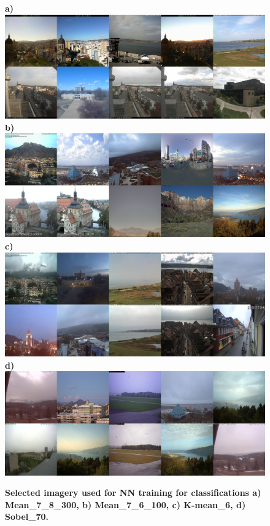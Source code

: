\documentclass[final,3p,times,authoryear]{elsarticle}
\begin{document}
\begin{figure}
\centering
\textbf{a)}\includegraphics[trim = 0mm 0mm 0mm 0mm,clip,scale=0.14]{Images/13-0_Mean_7_8_300_tiles.png}
\textbf{b)}\includegraphics[trim = 0mm 0mm 0mm 0mm,clip,scale=0.14]{Images/13-3_Mean_7_6_100_tiles.png}
\textbf{c)}\includegraphics[trim = 0mm 0mm 0mm 0mm,clip,scale=0.14]{Images/13-5_K-mean_6_tiles.png}
\textbf{d)}\includegraphics[trim = 0mm 0mm 0mm 0mm,clip,scale=0.14]{Images/13-9_Sobel_70_tiles.png}
\caption{\textbf{Selected imagery used for NN training for classifications 
a) Mean\_7\_8\_300, b) Mean\_7\_6\_100, c) K-mean\_6, d) Sobel\_70.}}
\label{fig:classImages}
\end{figure}
\end{document}
